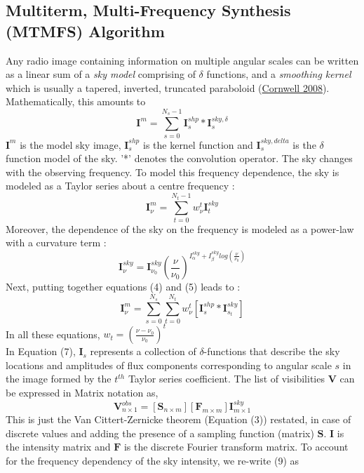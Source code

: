 \documentclass[twocolumn]{aastex61}
\begin{document}
\subsection{Multiterm, Multi-Frequency Synthesis (MTMFS) Algorithm}
Any radio image containing information on multiple angular scales can be written as a linear sum of a \textit{sky model} comprising of $\delta$ functions, and a \textit{smoothing kernel} which is usually a tapered, inverted, truncated paraboloid (\hyperref[cornwell2008]{Cornwell 2008}). Mathematically, this amounts to
\begin{equation}
\textbf{I}^{m} = \sum_{s=0}^{N_s-1}\textbf{I}_s^{shp} * \textbf{I}_s^{sky, \delta}
\end{equation} 
$\textbf{I}^{m}$ is the model sky image, $\textbf{I}_s^{shp}$ is the kernel function and $\textbf{I}_s^{sky, delta}$ is the $\delta$ function model of the sky. '*' denotes the convolution operator.
The sky changes with the observing frequency. To model this frequency dependence, the sky is modeled as a Taylor series about a centre frequency : 
\begin{equation}
\textbf{I}_\nu^{m} = \sum_{t=0}^{N_t-1}w_\nu^{t}\textbf{I}_t^{sky}
\end{equation}
Moreover, the dependence of the sky on the frequency is modeled as a power-law with a curvature term : 
\begin{equation}
\textbf{I}^{sky}_\nu = \textbf{I}^{sky}_{\nu_0}{(\frac{\nu}{\nu_0})}^{{I}^{sky}_\alpha + {I}^{sky}_\beta log(\frac{\nu}{\nu_0})}
\end{equation}
Next, putting together equations (4) and (5) leads to : 
\begin{equation}
\textbf{I}_\nu^{m} = \sum_{s=0}^{N_s}\sum_{t=0}^{N_t}w_\nu^{t}[\textbf{I}_s^{shp} *\textbf{I}_{s_t}^{sky}]
\end{equation}
In all these equations, $w_t = (\frac{\nu - \nu_0}{\nu_0})^{t}$\\
In Equation (7), $\textbf{I}_s$ represents a collection of $\delta$-functions that describe the sky locations and amplitudes of flux components corresponding to angular scale $s$ in the image formed by the $t^{th}$ Taylor series coefficient.
The list of visibilities $\textbf{V}$ can be expressed in Matrix notation as, 
\begin{equation}
\textbf{V}_{n\times1}^{obs} = [\textbf{S}_{n\times m}][\textbf{F}_{m\times m}]\textbf{I}_{m\times 1}^{sky}
\end{equation}
This is just the Van Cittert-Zernicke theorem (Equation (3)) restated, in case of discrete values and adding the presence of a sampling function (matrix) $\textbf{S}$. $\textbf{I}$ is the intensity matrix and $\textbf{F}$ is the discrete Fourier transform matrix. To account for the frequency dependency of the sky intensity, we re-write (9) as 
\end{document}
